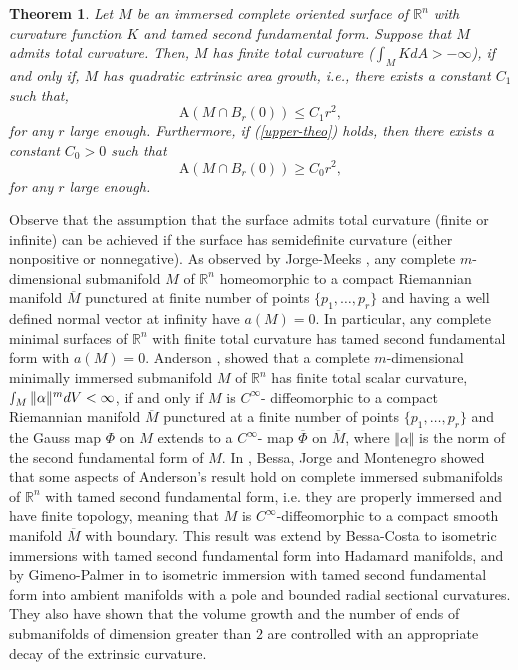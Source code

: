\documentclass[a4paper]{amsart}
\newtheorem{theorem}{Theorem}[section]
\theoremstyle{definition}
\numberwithin{equation}{section}
\begin{document}
\begin{theorem}\label{perimeter-th}Let $M$ be an immersed complete oriented  surface of $\mathbb{R}^{n}$ with curvature function $K$ and tamed second fundamental form. Suppose that $M$  admits total curvature. Then, $M$ has finite total curvature ($\int_MKdA>-\infty$), if and only if,
$M$ has quadratic extrinsic area growth, \emph{i.e.}, there exists a constant $C_1$ such that,
\begin{equation}\label{upper-theo}
\text{A}(M\cap B_r(0))\leq C_1 r^2,
\end{equation}
for any $r$ large enough. Furthermore, if (\ref{upper-theo}) holds, then there exists a constant $C_0>0$ such that
\begin{equation}
\text{A}(M\cap B_r(0))\geq C_0 r^2,
\end{equation}
for any $r$ large enough.
\end{theorem}
Observe that the assumption that the surface admits total curvature (finite or infinite) can be achieved if the surface has semidefinite curvature (either nonpositive or nonnegative). As observed by Jorge-Meeks \cite{JM}, any complete $m$-dimensional submanifold $M$ of $ \mathbb{R}^{n}$ homeomorphic to a compact Riemannian manifold
$\overline{M}$ punctured at finite number of points
$\{p_{1},\ldots,p_{r}\}$ and having a well defined normal vector at
infinity have $a(M)=0$. In particular, any  complete minimal surfaces of
$\mathbb{R}^{n}$ with finite total curvature has tamed second fundamental form with $a(M)=0$. Anderson \cite{A1},  showed that a complete $m$-dimensional minimally
immersed submanifold $M$ of $\mathbb{R}^{n}$ has finite total scalar
curvature, $\smallint_{M}\Vert \alpha \Vert^{m} dV<\infty $, if and
only if $M$ is $C^{\infty}$- diffeomorphic to a compact 
Riemannian manifold $\overline{M}$ punctured at a finite number of
points $ \{p_{1},\ldots,p_{r}\}$
 and the Gauss map $\Phi$ on $M$
extends to a $C^{\infty}$- map $\overline{\Phi}$ on $\overline{M}$,
where $\Vert \alpha \Vert$ is the norm of the second fundamental
form of $M$.
In \cite{Pac}, Bessa, Jorge and Montenegro  showed that some aspects of Anderson's result hold on  complete immersed submanifolds  of $\mathbb{R}^{n}$ with tamed second fundamental form, i.e. they are properly immersed and  have finite topology,  meaning that $M$ is $C^{\infty}$-diffeomorphic to a  compact smooth manifold $\overline{M}$ with boundary. This result was extend by  Bessa-Costa to isometric immersions with tamed second fundamental form into Hadamard manifolds, \cite{Pac2} and by Gimeno-Palmer in \cite{GPGap} to  isometric immersion with tamed second fundamental form into  ambient manifolds with a pole and bounded radial sectional curvatures. They  also have shown that the volume growth and the number of ends of  submanifolds of dimension greater than $2$ are controlled with an appropriate decay of the extrinsic curvature.  
\end{document}
